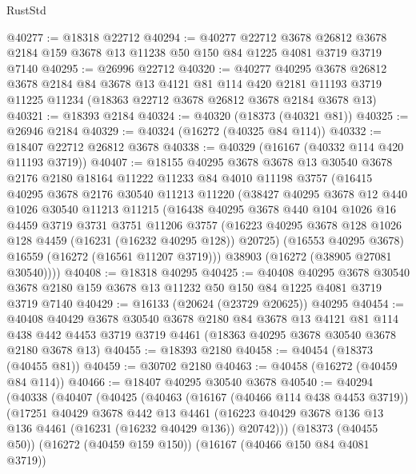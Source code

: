 \begin{lexlean}{RustStd}
\begin{coremodule}
@40277 := @18318 @22712
@40294 := @40277
    @22712
    @3678
    @26812
    @3678
    @2184
    @159
    @3678
    @13
    @11238
    @50
    @150
    @84
    @1225
    @4081
    @3719
    @3719
    @7140
@40295 := @26996 @22712
@40320 := @40277
    @40295
    @3678
    @26812
    @3678
    @2184
    @84
    @3678
    @13
    @4121
    @81
    @114
    @420
    @2181
    @11193
    @3719
    @11225
    @11234
    (@18363 @22712 @3678 @26812 @3678 @2184 @3678 @13)
@40321 := @18393 @2184
@40324 := @40320 (@18373 (@40321 @81))
@40325 := @26946 @2184
@40329 := @40324 (@16272 (@40325 @84 @114))
@40332 := @18407 @22712 @26812 @3678
@40338 := @40329 (@16167 (@40332 @114 @420 @11193 @3719))
@40407 := @18155
    @40295
    @3678
    @3678
    @13
    @30540
    @3678
    @2176
    @2180
    @18164
    @11222
    @11233
    @84
    @4010
    @11198
    @3757
    (@16415
      @40295
      @3678
      @2176
      @30540
      @11213
      @11220
      (@38427
        @40295
        @3678
        @12
        @440
        @1026
        @30540
        @11213
        @11215
        (@16438
          @40295
          @3678
          @440
          @104
          @1026
          @16
          @4459
          @3719
          @3731
          @3751
          @11206
          @3757
          (@16223 @40295 @3678 @128 @1026 @128 @4459 (@16231 (@16232 @40295 @128)) @20725)
          (@16553 @40295 @3678)
          @16559
          (@16272 (@16561 @11207 @3719)))
        @38903
        (@16272 (@38905 @27081 @30540))))
@40408 := @18318 @40295
@40425 := @40408
    @40295
    @3678
    @30540
    @3678
    @2180
    @159
    @3678
    @13
    @11232
    @50
    @150
    @84
    @1225
    @4081
    @3719
    @3719
    @7140
@40429 := @16133 (@20624 (@23729 @20625)) @40295
@40454 := @40408
    @40429
    @3678
    @30540
    @3678
    @2180
    @84
    @3678
    @13
    @4121
    @81
    @114
    @438
    @442
    @4453
    @3719
    @3719
    @4461
    (@18363 @40295 @3678 @30540 @3678 @2180 @3678 @13)
@40455 := @18393 @2180
@40458 := @40454 (@18373 (@40455 @81))
@40459 := @30702 @2180
@40463 := @40458 (@16272 (@40459 @84 @114))
@40466 := @18407 @40295 @30540 @3678
@40540 := @40294
    (@40338
      (@40407
        (@40425
          (@40463
            (@16167 (@40466 @114 @438 @4453 @3719))
            (@17251
              @40429
              @3678
              @442
              @13
              @4461
              (@16223 @40429 @3678 @136 @13 @136 @4461 (@16231 (@16232 @40429 @136)) @20742)))
          (@18373 (@40455 @50))
          (@16272 (@40459 @159 @150))
          (@16167 (@40466 @150 @84 @4081 @3719))

\end{coremodule}
\end{lexlean}
